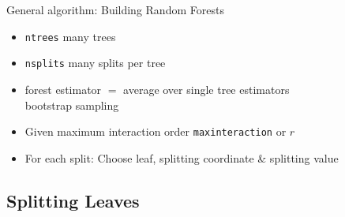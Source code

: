 \documentclass{beamer}
\begin{document}
\begin{frame}{General algorithm: Building Random Forests}

    \begin{itemize}
        \item \texttt{n\textunderscore trees} many trees 
        \item \texttt{n\textunderscore splits} many splits per tree
        \item forest estimator \(=\) average over single tree estimators\\
        bootstrap sampling
        \item Given maximum interaction order \texttt{max\textunderscore interaction} or \(r\)
        \item For each split: Choose leaf, splitting coordinate \& splitting value
    \end{itemize}
    
\vspace{1cm}

\end{frame}



\subsection{Splitting Leaves}
\end{document}
